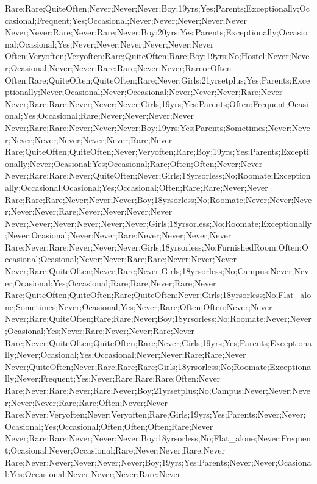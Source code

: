 Rare;Rare;QuiteOften;Never;Never;Never;Boy;19yrs;Yes;Parents;Exceptionally;Occasional;Frequent;Yes;Occasional;Never;Never;Never;Never;Never
Never;Never;Rare;Never;Rare;Never;Boy;20yrs;Yes;Parents;Exceptionally;Occasional;Ocasional;Yes;Never;Never;Never;Never;Never;Never
Often;Veryoften;Veryoften;Rare;QuiteOften;Rare;Boy;19yrs;No;Hostel;Never;Never;Ocasional;Never;Never;Rare;Rare;Never;Never;RareorOften
Often;Rare;QuiteOften;QuiteOften;Rare;Never;Girls;21yrsetplus;Yes;Parents;Exceptionally;Never;Ocasional;Never;Occasional;Never;Never;Never;Rare;Never
Never;Rare;Rare;Never;Never;Never;Girls;19yrs;Yes;Parents;Often;Frequent;Ocasional;Yes;Occasional;Rare;Never;Never;Never;Never
Never;Rare;Rare;Never;Never;Never;Boy;19yrs;Yes;Parents;Sometimes;Never;Never;Never;Never;Never;Never;Never;Rare;Never
Rare;QuiteOften;QuiteOften;Never;Veryoften;Rare;Boy;19yrs;Yes;Parents;Exceptionally;Never;Ocasional;Yes;Occasional;Rare;Often;Often;Never;Never
Never;Rare;Rare;Never;QuiteOften;Never;Girls;18yrsorless;No;Roomate;Exceptionally;Occasional;Ocasional;Yes;Occasional;Often;Rare;Rare;Never;Never
Rare;Rare;Rare;Never;Never;Never;Boy;18yrsorless;No;Roomate;Never;Never;Never;Never;Never;Rare;Never;Never;Never;Never
Never;Never;Never;Never;Never;Never;Girls;18yrsorless;No;Roomate;Exceptionally;Never;Ocasional;Never;Never;Rare;Never;Never;Never;Never
Rare;Never;Rare;Never;Never;Never;Girls;18yrsorless;No;FurnishedRoom;Often;Occasional;Ocasional;Never;Never;Rare;Rare;Never;Never;Never
Never;Rare;QuiteOften;Never;Rare;Never;Girls;18yrsorless;No;Campus;Never;Never;Ocasional;Yes;Occasional;Rare;Rare;Never;Rare;Never
Rare;QuiteOften;QuiteOften;Rare;QuiteOften;Never;Girls;18yrsorless;No;Flat_alone;Sometimes;Never;Ocasional;Yes;Never;Rare;Often;Often;Never;Never
Never;Rare;QuiteOften;Rare;Rare;Never;Boy;18yrsorless;No;Roomate;Never;Never;Ocasional;Yes;Never;Rare;Never;Never;Rare;Never
Rare;Never;QuiteOften;QuiteOften;Rare;Never;Girls;19yrs;Yes;Parents;Exceptionally;Never;Ocasional;Yes;Occasional;Never;Never;Rare;Rare;Never
Never;QuiteOften;Never;Rare;Rare;Rare;Girls;18yrsorless;No;Roomate;Exceptionally;Never;Frequent;Yes;Never;Rare;Rare;Rare;Often;Never
Rare;Never;Rare;Never;Rare;Never;Boy;21yrsetplus;No;Campus;Never;Never;Never;Never;Never;Rare;Rare;Often;Never;Never
Rare;Never;Veryoften;Never;Veryoften;Rare;Girls;19yrs;Yes;Parents;Never;Never;Ocasional;Yes;Occasional;Often;Often;Often;Rare;Never
Never;Rare;Rare;Never;Never;Never;Boy;18yrsorless;No;Flat_alone;Never;Frequent;Ocasional;Never;Occasional;Rare;Never;Never;Rare;Never
Rare;Never;Never;Never;Never;Never;Boy;19yrs;Yes;Parents;Never;Never;Ocasional;Yes;Occasional;Never;Never;Never;Rare;Never

